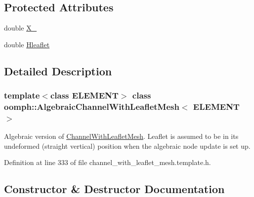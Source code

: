 \subsection*{Protected Attributes}
\begin{DoxyCompactItemize}
\item 
double \hyperlink{classoomph_1_1AlgebraicChannelWithLeafletMesh_a1577beb584df4ad0f8517563934855fc}{X\+\_}
\item 
double \hyperlink{classoomph_1_1AlgebraicChannelWithLeafletMesh_a22e6274b52941ae60cbe66287dd02fb4}{Hleaflet}
\end{DoxyCompactItemize}


\subsection{Detailed Description}
\subsubsection*{template$<$class E\+L\+E\+M\+E\+NT$>$\newline
class oomph\+::\+Algebraic\+Channel\+With\+Leaflet\+Mesh$<$ E\+L\+E\+M\+E\+N\+T $>$}

Algebraic version of \hyperlink{classoomph_1_1ChannelWithLeafletMesh}{Channel\+With\+Leaflet\+Mesh}. Leaflet is assumed to be in its undeformed (straight vertical) position when the algebraic node update is set up. 

Definition at line 333 of file channel\+\_\+with\+\_\+leaflet\+\_\+mesh.\+template.\+h.



\subsection{Constructor \& Destructor Documentation}
\mbox{\label{classoomph_1_1AlgebraicChannelWithLeafletMesh_a1e72e11c9971ed132efc95b808c83ccd}} 
